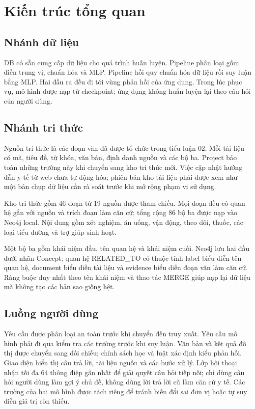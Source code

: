 \chapter{Kiến trúc tổng quan}
\section{Nhánh dữ liệu}
DB có sẵn cung cấp dữ liệu cho quá trình huấn luyện. Pipeline phân loại gồm điền trung vị, chuẩn hóa và MLP. Pipeline hồi quy chuẩn hóa dữ liệu rồi suy luận bằng MLP. Hai đầu ra đều đi tới vùng phản hồi của ứng dụng. Trong lúc phục vụ, mô hình được nạp từ checkpoint; ứng dụng không huấn luyện lại theo câu hỏi của người dùng.
\section{Nhánh tri thức}
Nguồn tri thức là các đoạn văn đã được tổ chức trong tiểu luận 02. Mỗi tài liệu có mã, tiêu đề, từ khóa, văn bản, định danh nguồn và các bộ ba. Project bảo toàn những trường này khi chuyển sang kho tri thức mới. Việc cập nhật hướng dẫn y tế từ web chưa tự động hóa; phiên bản kho tài liệu phải được xem như một bản chụp dữ liệu cần rà soát trước khi mở rộng phạm vi sử dụng.

Kho tri thức gồm 46 đoạn từ 19 nguồn được tham chiếu. Mọi đoạn đều có quan hệ gắn với nguồn và trích đoạn làm căn cứ; tổng cộng 86 bộ ba được nạp vào Neo4j local. Nội dung gồm xét nghiệm, ăn uống, vận động, theo dõi, thuốc, các loại tiểu đường và trợ giúp sinh hoạt.

Một bộ ba gồm khái niệm đầu, tên quan hệ và khái niệm cuối. Neo4j lưu hai đầu dưới nhãn Concept; quan hệ RELATED\_TO có thuộc tính label biểu diễn tên quan hệ, document biểu diễn tài liệu và evidence biểu diễn đoạn văn làm căn cứ. Ràng buộc duy nhất theo tên khái niệm và thao tác MERGE giúp nạp lại dữ liệu mà không tạo các bản sao giống hệt.
\section{Luồng người dùng}
Yêu cầu được phân loại an toàn trước khi chuyển đến truy xuất. Yêu cầu mô hình phải đi qua kiểm tra các trường trước khi suy luận. Văn bản và kết quả đồ thị được chuyển sang đối chiếu; chính sách học và luật xác định kiểu phản hồi. Giao diện hiển thị câu trả lời, tài liệu nguồn và các bước xử lý. Lớp hội thoại nhận tối đa 64 thông điệp gần nhất để giải quyết câu hỏi tiếp nối; chỉ dùng câu hỏi người dùng làm gợi ý chủ đề, không dùng lời trả lời cũ làm căn cứ y tế. Các trường của hai mô hình được tách riêng để tránh biến đổi sai đơn vị hoặc tự suy diễn giá trị còn thiếu.

